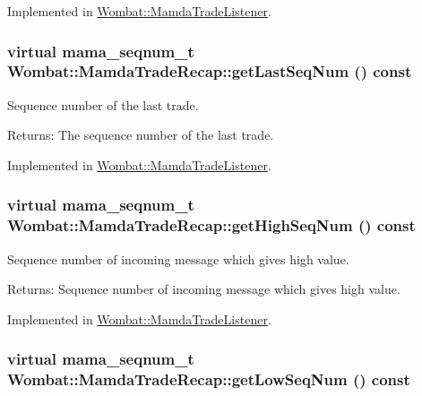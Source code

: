 Implemented in \hyperlink{classWombat_1_1MamdaTradeListener_c4b602c4ce2f49e81d4d20eef7d60711}{Wombat::Mamda\-Trade\-Listener}.\hypertarget{classWombat_1_1MamdaTradeRecap_ce7f7d8ec0c4d3df1905f7f68c16d42b}{
\subsubsection[getLastSeqNum]{\setlength{\rightskip}{0pt plus 5cm}virtual mama\_\-seqnum\_\-t Wombat::Mamda\-Trade\-Recap::get\-Last\-Seq\-Num () const}}
\label{classWombat_1_1MamdaTradeRecap_ce7f7d8ec0c4d3df1905f7f68c16d42b}


Sequence number of the last trade. 

\begin{Desc}
\item[Returns:]The sequence number of the last trade. \end{Desc}


Implemented in \hyperlink{classWombat_1_1MamdaTradeListener_bac3ca4094b86f6dd797e68417f04c15}{Wombat::Mamda\-Trade\-Listener}.\hypertarget{classWombat_1_1MamdaTradeRecap_f87da76851c02f0248c635836b7260ae}{
\subsubsection[getHighSeqNum]{\setlength{\rightskip}{0pt plus 5cm}virtual mama\_\-seqnum\_\-t Wombat::Mamda\-Trade\-Recap::get\-High\-Seq\-Num () const}}
\label{classWombat_1_1MamdaTradeRecap_f87da76851c02f0248c635836b7260ae}


Sequence number of incoming message which gives high value. 

\begin{Desc}
\item[Returns:]Sequence number of incoming message which gives high value. \end{Desc}


Implemented in \hyperlink{classWombat_1_1MamdaTradeListener_cfa0551c486d97d5cb04e17f2d2483d4}{Wombat::Mamda\-Trade\-Listener}.\hypertarget{classWombat_1_1MamdaTradeRecap_459c619eee736e8cfc32f4ff45873d16}{
\subsubsection[getLowSeqNum]{\setlength{\rightskip}{0pt plus 5cm}virtual mama\_\-seqnum\_\-t Wombat::Mamda\-Trade\-Recap::get\-Low\-Seq\-Num () const}}
\label{classWombat_1_1MamdaTradeRecap_459c619eee736e8cfc32f4ff45873d16}


